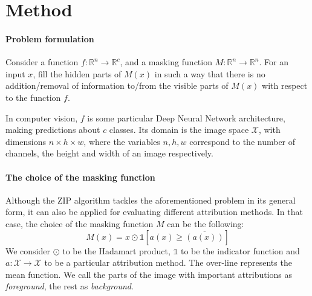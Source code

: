 \section{Method}
\label{sec:method}

\paragraph{Problem formulation}

Consider a function $f:\mathbb{R}^n \to \mathbb{R}^c$, and a masking function $M:\mathbb{R}^n \to \mathbb{R}^n$. For an input $x$, fill the hidden parts of $M(x)$ in such a way that there is no addition/removal of information to/from the visible parts of $M(x)$ with respect to the function $f$.

In computer vision, $f$ is some particular Deep Neural Network architecture, making predictions about $c$ classes. Its domain is the image space $\mathcal{X}$, with dimensions $n\times h\times w$, where the variables $n, h, w$ correspond to the number of channels, the height and width of an image respectively.


\paragraph{The choice of the masking function}

Although the ZIP algorithm tackles the aforementioned problem in its general form, it can also be applied for evaluating different attribution methods. In that case, the choice of the masking function $M$ can be the following: 
\begin{equation}
    M(x) = x \odot \mathds{1}[a(x) \geq \overline{(a(x))}]
\end{equation}
We consider $\odot$ to be the Hadamart product, $\mathds{1}$ to be the indicator function and $a:\mathcal{X} \to \mathcal{X}$ to be a particular attribution method. The over-line represents the mean function. 
We call the parts of the image with important attributions as \emph{foreground}, the rest as \emph{background}.

